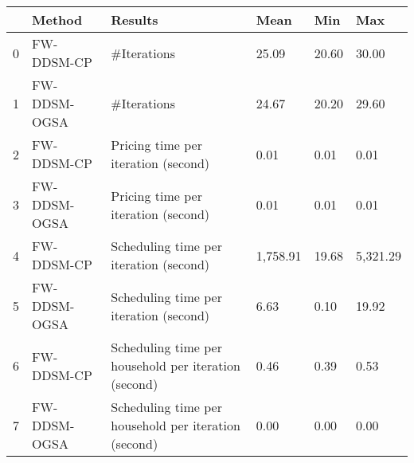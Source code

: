 \begin{tabular}{llllll}
\toprule
{} &        Method &                                           Results &      Mean &    Min &       Max \\
\midrule
0 &    FW-DDSM-CP &                                       \#Iterations &     25.09 &  20.60 &     30.00 \\
1 &  FW-DDSM-OGSA &                                       \#Iterations &     24.67 &  20.20 &     29.60 \\
2 &    FW-DDSM-CP &               Pricing time per iteration (second) &      0.01 &   0.01 &      0.01 \\
3 &  FW-DDSM-OGSA &               Pricing time per iteration (second) &      0.01 &   0.01 &      0.01 \\
4 &    FW-DDSM-CP &            Scheduling time per iteration (second) &  1,758.91 &  19.68 &  5,321.29 \\
5 &  FW-DDSM-OGSA &            Scheduling time per iteration (second) &      6.63 &   0.10 &     19.92 \\
6 &    FW-DDSM-CP &  Scheduling time per household per iteration (second) &      0.46 &   0.39 &      0.53 \\
7 &  FW-DDSM-OGSA &  Scheduling time per household per iteration (second) &      0.00 &   0.00 &      0.00 \\
\bottomrule
\end{tabular}
